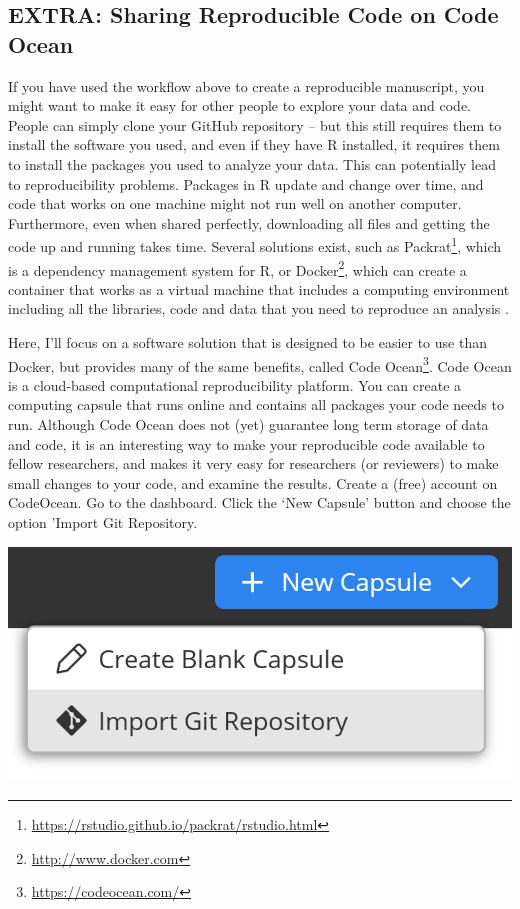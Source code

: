 \documentclass[
  oneside]{krantz}
\renewcommand{\href}[2]{#2\footnote{\url{#1}}}
\begin{document}
\hypertarget{extra-sharing-reproducible-code-on-code-ocean}{%
\subsection{EXTRA: Sharing Reproducible Code on Code Ocean}\label{extra-sharing-reproducible-code-on-code-ocean}}

If you have used the workflow above to create a reproducible manuscript, you might want to make it easy for other people to explore your data and code. People can simply clone your GitHub repository -- but this still requires them to install the software you used, and even if they have R installed, it requires them to install the packages you used to analyze your data. This can potentially lead to reproducibility problems. Packages in R update and change over time, and code that works on one machine might not run well on another computer. Furthermore, even when shared perfectly, downloading all files and getting the code up and running takes time. Several solutions exist, such as
\href{https://rstudio.github.io/packrat/rstudio.html}{Packrat}, which is a dependency management system for R, or \href{http://www.docker.com}{Docker}, which can create a container that works as a virtual machine that includes a computing environment including all the libraries, code and data that you need to reproduce an analysis \citep{wiebels_leveraging_2021}.

Here, I'll focus on a software solution that is designed to be easier to use than Docker, but provides many of the same benefits, called \href{https://codeocean.com/}{Code Ocean}. Code Ocean is a cloud-based computational reproducibility platform. You can create a computing capsule that runs online and contains all packages your code needs to run. Although Code Ocean does not (yet) guarantee long term storage of data and code, it is an interesting way to make your reproducible code available to fellow researchers, and makes it very easy for researchers (or reviewers) to make small changes to your code, and examine the results. Create a (free) account on CodeOcean. Go to the dashboard.
Click the `New Capsule' button and choose the option 'Import Git Repository.

\begin{center}\includegraphics[width=1\linewidth]{images/b27f6ddcc48c4b808418612be7efd929} \end{center}
\end{document}
